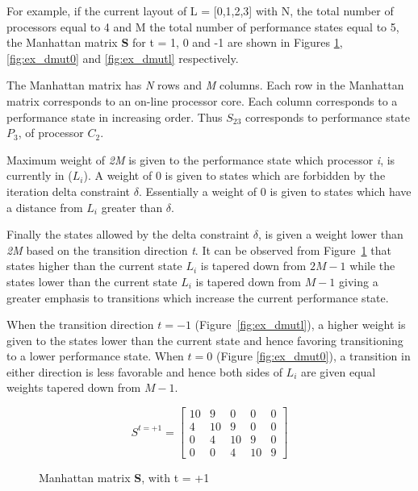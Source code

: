 For example, if the current layout of L = [0,1,2,3] with N, the total number of processors equal to 4 
and M the total number of performance states equal to 5,
the Manhattan matrix \textbf{S} for t = 1, 0 and -1 are shown in Figures \ref{fig:ex_dmuth}, 
\ref{fig:ex_dmut0} and \ref{fig:ex_dmutl} respectively. 

The Manhattan matrix has \textit{N} rows and \textit{M} columns. Each row in the Manhattan
matrix corresponds to an on-line processor core. Each column corresponds to a performance state
in increasing order. Thus $S_{23}$ corresponds to performance state $P_3$, of processor $C_2$. 

Maximum weight of \textit{2M} is given
to the performance state which processor \textit{i}, is currently in ($L_{i}$).
A weight of 0 is given to states which are forbidden by the iteration delta constraint $\delta$. 
Essentially a weight of 0 is given to states which have a distance from $L_{i}$ greater than $\delta$.

Finally the states allowed by the delta constraint $\delta$, is given a weight lower than
\textit{2M} based on the transition direction \textit{t}. It can be observed from Figure~\ref{fig:ex_dmuth} 
that states higher than the current state $L_{i}$ is tapered down from $2M-1$ while the states
lower than the current state $L_{i}$ is tapered down from $M-1$ giving a greater emphasis to transitions 
which increase the current performance state.

When the transition direction $t = -1$ (Figure~\ref{fig:ex_dmutl}), 
a higher weight is given to the states lower than the current state and hence favoring 
transitioning to a lower performance state. When $t = 0$ (Figure \ref{fig:ex_dmut0}), 
a transition in either direction is less favorable and hence both sides of $L_{i}$ 
are given equal weights tapered down from $M-1$.


\begin{figure}[h!]
\centering
\begin{equation*}
    S^{t = +1} = \left[
     \begin{array}{ccccc}
       10 & 9 & 0 & 0 & 0 \\
       4 & 10 & 9 & 0 & 0 \\
       0 & 4 & 10 & 9 & 0 \\
       0 & 0 & 4 & 10 & 9
     \end{array}
   \right]
\end{equation*}
\caption{Manhattan matrix \textbf{S}, with t = +1}
\label{fig:ex_dmuth}
\end{figure}

